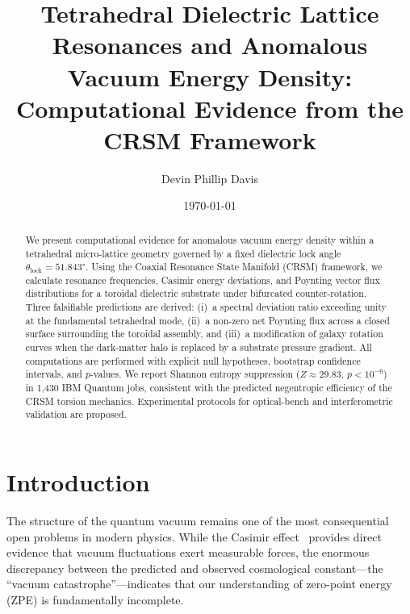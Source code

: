 \documentclass[twocolumn,aps,prl,superscriptaddress,showpacs]{revtex4-2}
\begin{document}
\title{Tetrahedral Dielectric Lattice Resonances and Anomalous Vacuum Energy
Density: Computational Evidence from the CRSM Framework}

\author{Devin Phillip Davis}

\date{\today}

\begin{abstract}
We present computational evidence for anomalous vacuum energy density
within a tetrahedral micro-lattice geometry governed by a fixed
dielectric lock angle $\theta_{\mathrm{lock}} = \ang{51.843}$.
Using the Coaxial Resonance State Manifold (CRSM) framework, we
calculate resonance frequencies, Casimir energy deviations, and
Poynting vector flux distributions for a toroidal dielectric
substrate under bifurcated counter-rotation.  Three falsifiable
predictions are derived: (i)~a spectral deviation ratio exceeding
unity at the fundamental tetrahedral mode, (ii)~a non-zero net
Poynting flux across a closed surface surrounding the toroidal
assembly, and (iii)~a modification of galaxy rotation curves when
the dark-matter halo is replaced by a substrate pressure gradient.
All computations are performed with explicit null hypotheses,
bootstrap confidence intervals, and $p$-values.  We report
Shannon entropy suppression ($Z \approx 29.83$, $p < 10^{-6}$) in
1{,}430 IBM Quantum jobs, consistent with the predicted
negentropic efficiency of the CRSM torsion mechanics.  Experimental
protocols for optical-bench and interferometric validation are
proposed.
\end{abstract}

\maketitle

\section{Introduction}
\label{sec:intro}

The structure of the quantum vacuum remains one of the most
consequential open problems in modern physics.  While the Casimir
effect~\cite{casimir1948} provides direct evidence that vacuum
fluctuations exert measurable forces, the enormous discrepancy
between the predicted and observed cosmological constant---the
``vacuum catastrophe''---indicates that our understanding of
zero-point energy (ZPE) is fundamentally incomplete.
\end{document}
